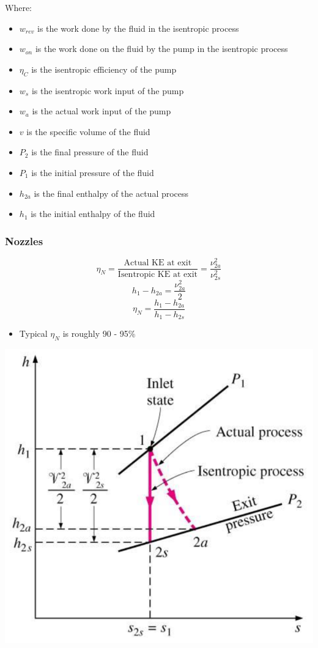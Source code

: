 \documentclass[11pt]{article}
\begin{document}
Where:
\begin{itemize}
\item \(w_{rev}\) is the work done by the fluid in the isentropic process
\item \(w_{on}\) is the work done on the fluid by the pump in the isentropic process
\item \(\eta_C\) is the isentropic efficiency of the pump
\item \(w_s\) is the isentropic work input of the pump
\item \(w_a\) is the actual work input of the pump
\item \(v\) is the specific volume of the fluid
\item \(P_2\) is the final pressure of the fluid
\item \(P_1\) is the initial pressure of the fluid
\item \(h_{2a}\) is the final enthalpy of the actual process
\item \(h_1\) is the initial enthalpy of the fluid
\end{itemize}

 \newpage
\subsubsection{Nozzles}
\label{sec:orgc2e83fc}
\[\eta_N = \frac{\text{Actual KE at exit}}{\text{Isentropic KE at exit}} = \frac{\nu_{2a}^2}{\nu_{2s}^2}\]
\[h_1 - h_{2a} = \frac{\nu_{2a}^2}{2}\]
\[\eta_N = \frac{h_1 - h_{2a}}{h_1 - h_{2s}}\]

\begin{itemize}
\item Typical \(\eta_N\) is roughly 90 - 95\%
\end{itemize}

\begin{center}
\includegraphics[scale=0.8]{./images/isentropic-efficiency-of-nozzles.png}
\end{center}
\end{document}
